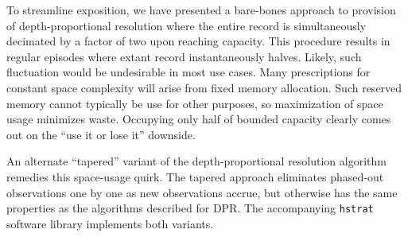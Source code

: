 To streamline exposition, we have presented a bare-bones approach to provision of depth-proportional resolution where the entire record is simultaneously decimated by a factor of two upon reaching capacity.
This procedure results in regular episodes where extant record instantaneously halves.
Likely, such fluctuation would be undesirable in most use cases.
Many prescriptions for constant space complexity will arise from fixed memory allocation.
Such reserved memory cannot typically be use for other purposes, so maximization of space usage minimizes waste.
Occupying only half of bounded capacity clearly comes out on the ``use it or lose it'' downside.

An alternate ``tapered'' variant of the depth-proportional resolution algorithm remedies this space-usage quirk.
The tapered approach eliminates phased-out observations one by one as new observations accrue, but otherwise has the same properties as the algorithms described for DPR.
The accompanying \texttt{hstrat} software library implements both variants.



% 
% 
